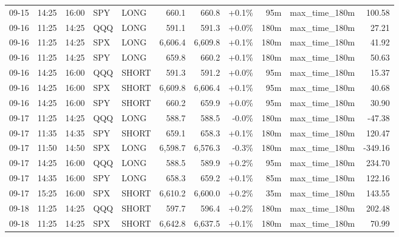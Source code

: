 \documentclass[11pt,a4paper,twoside]{article}
\begin{document}
\begin{center}
\begin{longtable}{>{\color{txtmain}}l l l l l r r r r >{\color{txtmain}}l r}
09-15 & 14:25 & 16:00 & SPY & LONG & 660.1 & 660.8 & \textcolor{wingreen}{+0.1\%} & 95m & max\_time\_180m & \textcolor{wingreen}{100.58} \\
09-16 & 11:25 & 14:25 & QQQ & LONG & 591.1 & 591.3 & \textcolor{wingreen}{+0.0\%} & 180m & max\_time\_180m & \textcolor{wingreen}{27.21} \\
09-16 & 11:25 & 14:25 & SPX & LONG & 6,606.4 & 6,609.8 & \textcolor{wingreen}{+0.1\%} & 180m & max\_time\_180m & \textcolor{wingreen}{41.92} \\
09-16 & 11:25 & 14:25 & SPY & LONG & 659.8 & 660.2 & \textcolor{wingreen}{+0.1\%} & 180m & max\_time\_180m & \textcolor{wingreen}{50.63} \\
09-16 & 14:25 & 16:00 & QQQ & SHORT & 591.3 & 591.2 & \textcolor{wingreen}{+0.0\%} & 95m & max\_time\_180m & \textcolor{wingreen}{15.37} \\
09-16 & 14:25 & 16:00 & SPX & SHORT & 6,609.8 & 6,606.4 & \textcolor{wingreen}{+0.1\%} & 95m & max\_time\_180m & \textcolor{wingreen}{40.68} \\
09-16 & 14:25 & 16:00 & SPY & SHORT & 660.2 & 659.9 & \textcolor{wingreen}{+0.0\%} & 95m & max\_time\_180m & \textcolor{wingreen}{30.90} \\
09-17 & 11:25 & 14:25 & QQQ & LONG & 588.7 & 588.5 & \textcolor{lossred}{-0.0\%} & 180m & max\_time\_180m & \textcolor{lossred}{-47.38} \\
09-17 & 11:35 & 14:35 & SPY & SHORT & 659.1 & 658.3 & \textcolor{wingreen}{+0.1\%} & 180m & max\_time\_180m & \textcolor{wingreen}{120.47} \\
09-17 & 11:50 & 14:50 & SPX & LONG & 6,598.7 & 6,576.3 & \textcolor{lossred}{-0.3\%} & 180m & max\_time\_180m & \textcolor{lossred}{-349.16} \\
09-17 & 14:25 & 16:00 & QQQ & LONG & 588.5 & 589.9 & \textcolor{wingreen}{+0.2\%} & 95m & max\_time\_180m & \textcolor{wingreen}{234.70} \\
09-17 & 14:35 & 16:00 & SPY & LONG & 658.3 & 659.2 & \textcolor{wingreen}{+0.1\%} & 85m & max\_time\_180m & \textcolor{wingreen}{122.16} \\
09-17 & 15:25 & 16:00 & SPX & SHORT & 6,610.2 & 6,600.0 & \textcolor{wingreen}{+0.2\%} & 35m & max\_time\_180m & \textcolor{wingreen}{143.55} \\
09-18 & 11:25 & 14:25 & QQQ & SHORT & 597.7 & 596.4 & \textcolor{wingreen}{+0.2\%} & 180m & max\_time\_180m & \textcolor{wingreen}{202.48} \\
09-18 & 11:25 & 14:25 & SPX & SHORT & 6,642.8 & 6,637.5 & \textcolor{wingreen}{+0.1\%} & 180m & max\_time\_180m & \textcolor{wingreen}{70.99} \\

\end{longtable}
\end{center}
\end{document}
